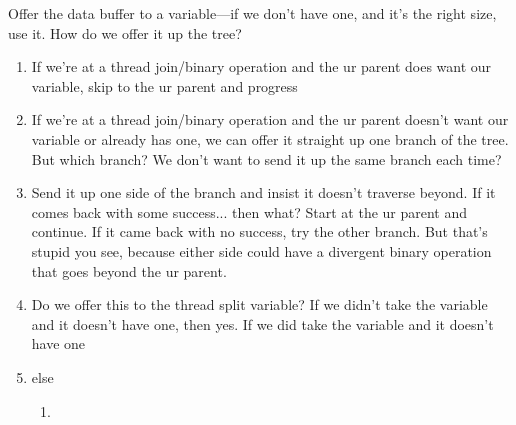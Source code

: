 \documentclass[11pt]{article}
\begin{document}
Offer the data buffer to a variable---if we don't have one, and it's the right size, use it. How do we offer it up the tree?
\begin{enumerate}
\item If we're at a thread join/binary operation and the ur parent does want our variable, skip to the ur parent and progress
\item If we're at a thread join/binary operation and the ur parent doesn't want our variable or already has one, we can offer it straight up one branch of the tree. But which branch? We don't want to send it up the same branch each time?
\item Send it up one side of the branch and insist it doesn't traverse beyond. If it comes back with some success... then what? Start at the ur parent and continue. If it came back with no success, try the other branch. But that's stupid you see, because either side could have a divergent binary operation that goes beyond the ur parent.

\item Do we offer this to the thread split variable? If we didn't take the variable and it doesn't have one, then yes. If we did take the variable and it doesn't have one 
\item else
\begin{enumerate}
\item 
\end{enumerate}
\end{enumerate}
\end{document}
